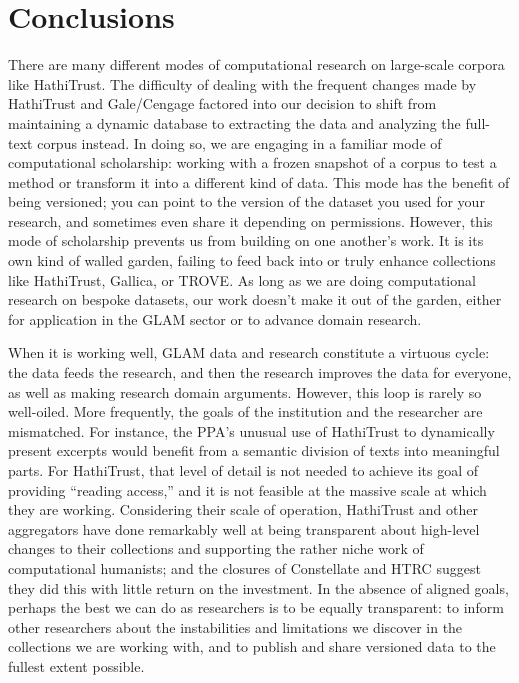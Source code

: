\documentclass{anthology-ch}         %
\begin{document}
\section{Conclusions}

There are many different modes of computational research on large-scale corpora like HathiTrust. The difficulty of dealing with the frequent changes made by HathiTrust and Gale/Cengage factored into our decision to shift from maintaining a dynamic database to extracting the data and analyzing the full-text corpus instead. In doing so, we are engaging in a familiar mode of computational scholarship: working with a frozen snapshot of a corpus to test a method or transform it into a different kind of data. This mode has the benefit of being versioned; you can point to the version of the dataset you used for your research, and sometimes even share it depending on permissions. However, this mode of scholarship prevents us from building on one another’s work. It is its own kind of walled garden, failing to feed back into or truly enhance collections like HathiTrust, Gallica, or TROVE. As long as we are doing computational research on bespoke datasets, our work doesn’t make it out of the garden, either for application in the GLAM sector or to advance domain research. 

When it is working well, GLAM data and research constitute a virtuous cycle: the data feeds the research, and then the research improves the data for everyone, as well as making research domain arguments. However, this loop is rarely so well-oiled. More frequently, the goals of the institution and the researcher are mismatched. For instance, the PPA’s unusual use of HathiTrust to dynamically present excerpts would benefit from a semantic division of texts into meaningful parts. For HathiTrust, that level of detail is not needed to achieve its goal of providing “reading access,” and it is not feasible at the massive scale at which they are working. Considering their scale of operation, HathiTrust and other aggregators have done remarkably well at being transparent about high-level changes to their collections and supporting the rather niche work of computational humanists; and the closures of Constellate and HTRC suggest they did this with little return on the investment. In the absence of aligned goals, perhaps the best we can do as researchers is to be equally transparent: to inform other researchers about the instabilities and limitations we discover in the collections we are working with, and to publish and share versioned data to the fullest extent possible. 
\end{document}
